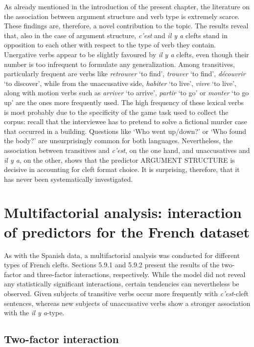 As already mentioned in the introduction of the present chapter, the literature on the association between argument structure and verb type is extremely scarce. These findings are, therefore, a novel contribution to the topic. The results reveal that, also in the case of argument structure, \textit{c'est} and \textit{il y a} clefts stand in opposition to each other with respect to the type of verb they contain. Unergative verbs appear to be slightly favoured by \textit{il y a} clefts, even though their number is too infrequent to formulate any generalization.
Among transitives, particularly frequent are verbs like \textit{retrouver} `to find', \textit{trouver} `to find', \textit{découvrir} `to discover', while from the unaccusative side, \textit{habiter} `to live', \textit{vivre} `to live', along with motion verbs such as \textit{arriver} `to arrive', \textit{partir} `to go' or \textit{monter} `to go up' are the ones more frequently used. The high frequency of these lexical verbs is most probably due to the specificity of the game task used to collect the corpus: recall that the interviewee has to pretend to solve a fictional murder case that occurred in a building. Questions like `Who went up/down?' or `Who found the body?' are unsurprisingly common for both languages.
Nevertheless, the association between transitives and \textit{c'est}, on the one hand, and unaccusatives and \textit{il y a}, on the other, shows that the predictor {\selectfont ARGUMENT STRUCTURE} is decisive in accounting for cleft format choice. It is surprising, therefore, that it has never been systematically investigated.


\section{Multifactorial analysis: interaction of predictors for the French dataset}
As with the Spanish data, a multifactorial analysis was conducted for different types of French clefts. Sections 5.9.1 and 5.9.2 present the results of the two-factor and three-factor interactions, respectively. While the model did not reveal any statistically significant interactions, certain tendencies can nevertheless be observed. Given subjects of transitive verbs occur more frequently with \textit{c’est}-cleft sentences, whereas new subjects of unaccusative verbs show a stronger association with the \textit{il y a}-type.

\subsection{Two-factor interaction}

